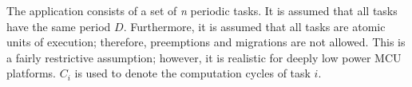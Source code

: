 The application consists of a set of \textit{n} periodic tasks. It is assumed that all tasks have the same period $D$. Furthermore, it is assumed that all tasks are atomic units of execution; therefore, preemptions and migrations are not allowed. This is a fairly restrictive assumption; however, it is realistic for deeply low power MCU platforms. $C_i$ is used to denote the computation cycles of task $i$.






